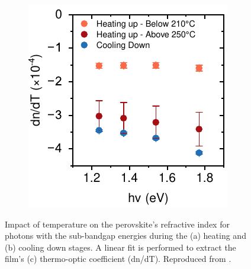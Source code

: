 \begin{figure}[htbp]
\begin{subfigure}{0.32\textwidth}
        \caption{}
        \label{fig:ellipsometry:thermooptic_cooling}
    \end{subfigure}
    \hfill
    \begin{subfigure}{0.3\textwidth}
        \includegraphics[width=\textwidth]{chapters/ellipsometry/image/Thermo-optic_Coefficient_energy.pdf}
        \caption{}
        \label{fig:ellipsometry:thermooptic_energy}
    \end{subfigure}
    \caption[Impact of temperature on the perovskite's refractive index for photons with the sub-bandgap energies during the heating and cooling down stages.]{Impact of temperature on the perovskite's refractive index for photons with the sub-bandgap energies during the (a) heating and (b) cooling down stages. A linear fit is performed to extract the film's (c) thermo-optic coefficient (dn/dT). Reproduced from \cite{Papadopoulou2024InEllipsometry}.}
    \label{fig:ellipsometry:thermooptic}
\end{figure}

